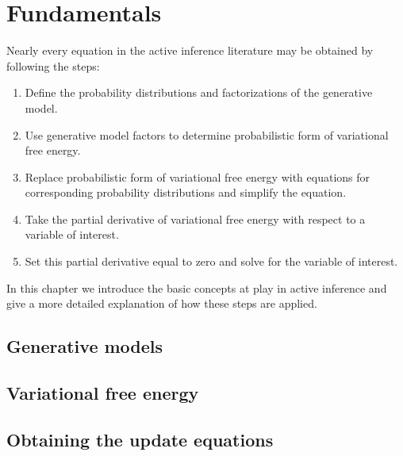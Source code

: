 \chapter{Fundamentals}

Nearly every equation in the active inference literature may be obtained by following the steps:

\begin{enumerate}
    \item Define the probability distributions and factorizations of the generative model.
    \item Use generative model factors to determine probabilistic form of variational free energy.
    \item Replace probabilistic form of variational free energy with equations for corresponding probability distributions and simplify the equation.
    \item Take the partial derivative of variational free energy with respect to a variable of interest.
    \item Set this partial derivative equal to zero and solve for the variable of interest.
\end{enumerate}

In this chapter we introduce the basic concepts at play in active inference and give a more detailed explanation of how these steps are applied.

\section{Generative models}
\section{Variational free energy}
\section{Obtaining the update equations}
